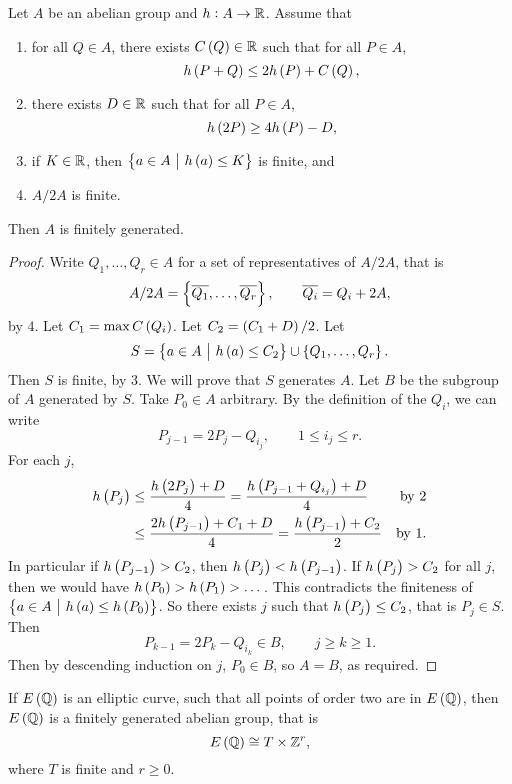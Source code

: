 \pagebreak

\begin{proposition}
Let $ A $ be an abelian group and $ h : A \to \mathbb{R} $. Assume that
\begin{enumerate}
\item for all $ Q \in A $, there exists $ C\br{Q} \in \RR $ such that for all $ P \in A $,
$$ h\br{P + Q} \le 2h\br{P} + C\br{Q}, $$
\item there exists $ D \in \mathbb{R} $ such that for all $ P \in A $,
$$ h\br{2P} \ge 4h\br{P} - D, $$
\item if $ K \in \mathbb{R} $, then $ \cbr{a \in A \st h\br{a} \le K} $ is finite, and
\item $ A / 2A $ is finite.
\end{enumerate}
Then $ A $ is finitely generated.
\end{proposition}

\begin{proof}
Write $ Q_1, \dots, Q_r \in A $ for a set of representatives of $ A / 2A $, that is
$$ A / 2A = \cbr{\overline{Q_1}, \dots, \overline{Q_r}}, \qquad \overline{Q_i} = Q_i + 2A, $$
by $ 4 $. Let $ C_1 = \max C\br{Q_i} $. Let $ C_2 = \br{C_1 + D} / 2 $. Let
$$ S = \cbr{a \in A \st h\br{a} \le C_2} \cup \cbr{Q_1, \dots, Q_r}. $$
Then $ S $ is finite, by $ 3 $. We will prove that $ S $ generates $ A $. Let $ B $ be the subgroup of $ A $ generated by $ S $. Take $ P_0 \in A $ arbitrary. By the definition of the $ Q_i $, we can write
$$ P_{j - 1} = 2P_j - Q_{i_j}, \qquad 1 \le i_j \le r. $$
For each $ j $,
\begin{align*}
h\br{P_j}
& \le \dfrac{h\br{2P_j} + D}{4}
= \dfrac{h\br{P_{j - 1} + Q_{i_j}} + D}{4} & \text{by} \ 2 \\
& \le \dfrac{2h\br{P_{j - 1}} + C_1 + D}{4}
= \dfrac{h\br{P_{j - 1}} + C_2}{2} & \text{by} \ 1.
\end{align*}
In particular if $ h\br{P_{j - 1}} > C_2 $, then $ h\br{P_j} < h\br{P_{j - 1}} $. If $ h\br{P_j} > C_2 $ for all $ j $, then we would have $ h\br{P_0} > h\br{P_1} > \dots $. This contradicts the finiteness of $ \cbr{a \in A \st h\br{a} \le h\br{P_0}} $. So there exists $ j $ such that $ h\br{P_j} \le C_2 $, that is $ P_j \in S $. Then
$$ P_{k - 1} = 2P_k - Q_{i_k} \in B, \qquad j \ge k \ge 1. $$
Then by descending induction on $ j $, $ P_0 \in B $, so $ A = B $, as required.
\end{proof}

\begin{corollary}
If $ E\br{\QQ} $ is an elliptic curve, such that all points of order two are in $ E\br{\QQ} $, then $ E\br{\QQ} $ is a finitely generated abelian group, that is
$$ E\br{\QQ} \cong T \times \ZZ^r, $$
where $ T $ is finite and $ r \ge 0 $.
\end{corollary}

